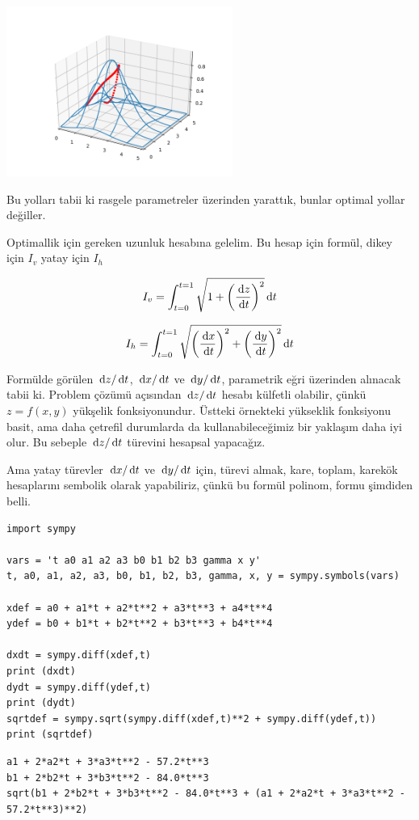 \documentclass[12pt,fleqn]{article}\usepackage{../../common}
\begin{document}
\includegraphics[width=20em]{calc_multi_40_elev_03.png}

Bu yolları tabii ki rasgele parametreler üzerinden yarattık, bunlar optimal
yollar değiller.

Optimallik için gereken uzunluk hesabına gelelim. Bu hesap için
formül, dikey için $I_v$ yatay için $I_h$

$$
I_v = \int_{t=0}^{t=1} \sqrt{1 + \left(\frac{\,\mathrm{d} z}{\,\mathrm{d} t} \right)^2 } \,\mathrm{d} t
$$

$$
I_h = \int_{t=0}^{t=1} \sqrt{
\left(\frac{\,\mathrm{d} x}{\,\mathrm{d} t} \right)^2 + 
\left(\frac{\,\mathrm{d} y}{\,\mathrm{d} t} \right)^2
} 
\,\mathrm{d} t
$$


Formülde görülen $\,\mathrm{d} z/\,\mathrm{d} t$, $\,\mathrm{d} x/\,\mathrm{d} t$ ve $\,\mathrm{d} y/\,\mathrm{d} t$, parametrik
eğri üzerinden alınacak tabii ki. Problem çözümü açısından $\,\mathrm{d} z/\,\mathrm{d} t$
hesabı külfetli olabilir, çünkü $z = f(x,y)$ yükşelik
fonksiyonundur. Üstteki örnekteki yükseklik fonksiyonu basit, ama daha
çetrefil durumlarda da kullanabileceğimiz bir yaklaşım daha iyi olur. Bu
sebeple $\,\mathrm{d} z/\,\mathrm{d} t$ türevini hesapsal yapacağız.

Ama yatay türevler $\,\mathrm{d} x/\,\mathrm{d} t$ ve $\,\mathrm{d} y/\,\mathrm{d} t$ için, türevi almak, kare,
toplam, karekök hesaplarını sembolik olarak yapabiliriz, çünkü bu formül
polinom, formu şimdiden belli.

\begin{verbatim}
import sympy

vars = 't a0 a1 a2 a3 b0 b1 b2 b3 gamma x y'
t, a0, a1, a2, a3, b0, b1, b2, b3, gamma, x, y = sympy.symbols(vars)

xdef = a0 + a1*t + a2*t**2 + a3*t**3 + a4*t**4
ydef = b0 + b1*t + b2*t**2 + b3*t**3 + b4*t**4

dxdt = sympy.diff(xdef,t)
print (dxdt)
dydt = sympy.diff(ydef,t)
print (dydt)
sqrtdef = sympy.sqrt(sympy.diff(xdef,t)**2 + sympy.diff(ydef,t))
print (sqrtdef)
\end{verbatim}

\begin{verbatim}
a1 + 2*a2*t + 3*a3*t**2 - 57.2*t**3
b1 + 2*b2*t + 3*b3*t**2 - 84.0*t**3
sqrt(b1 + 2*b2*t + 3*b3*t**2 - 84.0*t**3 + (a1 + 2*a2*t + 3*a3*t**2 - 57.2*t**3)**2)
\end{verbatim}
\end{document}
